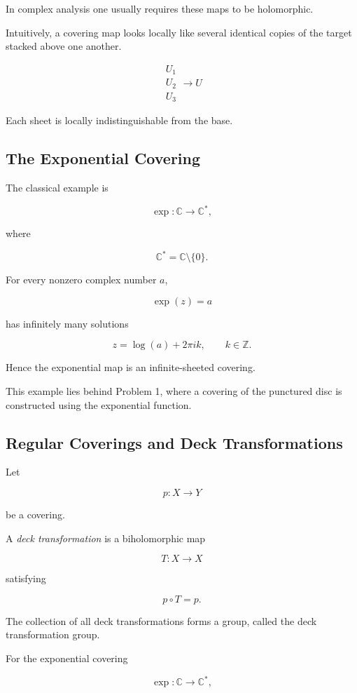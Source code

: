 \documentclass[12pt,a4paper]{article}
\theoremstyle{notespace}
\begin{document}
In complex analysis one usually requires these maps to be holomorphic.

Intuitively, a covering map looks locally like several identical copies of the target stacked above one another.

\[
\begin{array}{c}
	U_1\\
	U_2\\
	U_3
\end{array}
\longrightarrow
U
\]

Each sheet is locally indistinguishable from the base.

\subsection{The Exponential Covering}

The classical example is

\[
\exp:\mathbb C\to\mathbb C^*,
\]

where

\[
\mathbb C^*=\mathbb C\setminus\{0\}.
\]

For every nonzero complex number \(a\),

\[
\exp(z)=a
\]

has infinitely many solutions

\[
z=\log(a)+2\pi i k,
\qquad k\in\mathbb Z.
\]

Hence the exponential map is an infinite-sheeted covering.

This example lies behind Problem 1, where a covering of the punctured disc is constructed using the exponential function.

\subsection{Regular Coverings and Deck Transformations}

Let

\[
p:X\to Y
\]

be a covering.

A \emph{deck transformation} is a biholomorphic map

\[
T:X\to X
\]

satisfying

\[
p\circ T=p.
\]

The collection of all deck transformations forms a group, called the deck transformation group.

For the exponential covering

\[
\exp:\mathbb C\to\mathbb C^*,
\]
\end{document}

